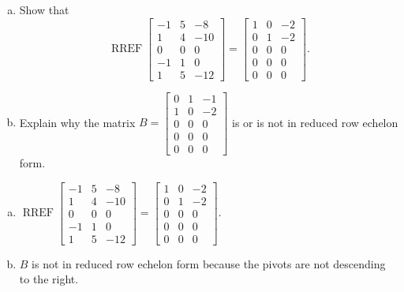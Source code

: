 
\begin{exerciseStatement}

\begin{enumerate}[(a)]
\item Show that \[\operatorname{RREF} \left[\begin{array}{ccc}
-1 & 5 & -8 \\
1 & 4 & -10 \\
0 & 0 & 0 \\
-1 & 1 & 0 \\
1 & 5 & -12
\end{array}\right] = \left[\begin{array}{ccc}
1 & 0 & -2 \\
0 & 1 & -2 \\
0 & 0 & 0 \\
0 & 0 & 0 \\
0 & 0 & 0
\end{array}\right] .\]
\item Explain why the matrix \(B= \left[\begin{array}{ccc}
0 & 1 & -1 \\
1 & 0 & -2 \\
0 & 0 & 0 \\
0 & 0 & 0 \\
0 & 0 & 0
\end{array}\right] \) is or is not in reduced row echelon form.
\end{enumerate}
    
\end{exerciseStatement}
    
\begin{exerciseAnswer} 

\begin{enumerate}[(a)]
\item \(\operatorname{RREF} \left[\begin{array}{ccc}
-1 & 5 & -8 \\
1 & 4 & -10 \\
0 & 0 & 0 \\
-1 & 1 & 0 \\
1 & 5 & -12
\end{array}\right] = \left[\begin{array}{ccc}
1 & 0 & -2 \\
0 & 1 & -2 \\
0 & 0 & 0 \\
0 & 0 & 0 \\
0 & 0 & 0
\end{array}\right] .\)
\item \(B\) is not in reduced row echelon form because the pivots are not descending to the right. 
\end{enumerate}
    
\end{exerciseAnswer}
    
